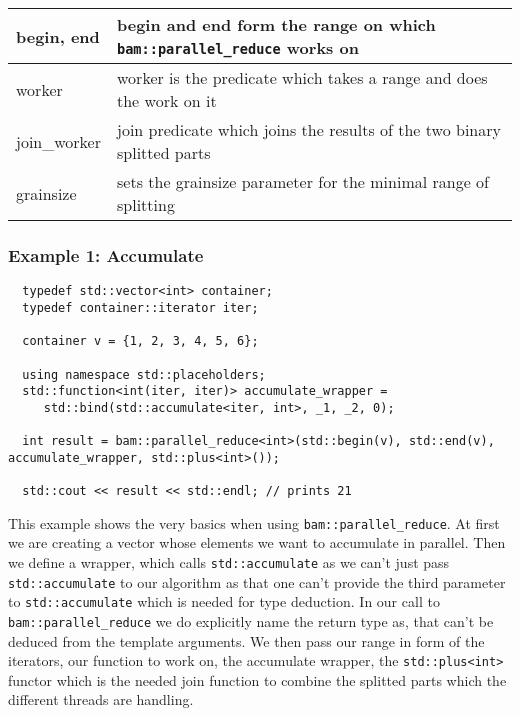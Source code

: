 \documentclass[11pt, a4paper]{article}
\begin{document}
\begin{center}
  \begin{tabular}{ | l |  p{10cm} | }
    \hline
	begin,  end & begin and end form the range on which \texttt{bam::parallel\_reduce} works on \\ \hline
	worker & worker is the predicate which takes a range and does the work on it \\  \hline
	join\_worker & join predicate which joins the results of the two binary splitted parts \\ \hline
	grainsize & sets the grainsize parameter for the minimal range of splitting \\ \hline
  \end{tabular}
\end{center}

\subsubsection{Example 1: Accumulate}

\begin{lstlisting}
  typedef std::vector<int> container;
  typedef container::iterator iter;

  container v = {1, 2, 3, 4, 5, 6};

  using namespace std::placeholders;
  std::function<int(iter, iter)> accumulate_wrapper = 
     std::bind(std::accumulate<iter, int>, _1, _2, 0);

  int result = bam::parallel_reduce<int>(std::begin(v), std::end(v), accumulate_wrapper, std::plus<int>());

  std::cout << result << std::endl; // prints 21
\end{lstlisting}

This example shows the very basics when using \texttt{bam::parallel\_reduce}. At first we are creating a vector whose elements we want to accumulate in parallel. Then we define a wrapper, which calls \texttt{std::accumulate} as we can't just pass \texttt{std::accumulate} to our algorithm as that one can't provide the third parameter to \texttt{std::accumulate} which is needed for type deduction. In our call to \texttt{bam::parallel\_reduce} we do explicitly name the return type as, that can't be deduced from the template arguments. We then pass our range in form of the iterators, our function to work on, the accumulate wrapper, the \texttt{std::plus<int>} functor which is the needed join function to combine the splitted parts which the different threads are handling. 
\end{document}
